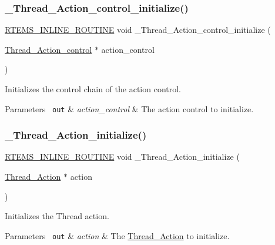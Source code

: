 \subsubsection{\texorpdfstring{\_Thread\_Action\_control\_initialize()}{\_Thread\_Action\_control\_initialize()}}
{\footnotesize\ttfamily \mbox{\hyperlink{group__RTEMSScoreBaseDefs_gac216239df231d5dbd15e3520b0b9313f}{R\+T\+E\+M\+S\+\_\+\+I\+N\+L\+I\+N\+E\+\_\+\+R\+O\+U\+T\+I\+NE}} void \+\_\+\+Thread\+\_\+\+Action\+\_\+control\+\_\+initialize (\begin{DoxyParamCaption}\item[{\mbox{\hyperlink{structThread__Action__control}{Thread\+\_\+\+Action\+\_\+control}} $\ast$}]{action\+\_\+control }\end{DoxyParamCaption})}



Initializes the control chain of the action control. 


\begin{DoxyParams}[1]{Parameters}
\mbox{\texttt{ out}}  & {\em action\+\_\+control} & The action control to initialize. \\
\hline
\end{DoxyParams}
\mbox{\label{group__RTEMSScoreThread_gaaae54223afb793365b74ff959e0d2369}} 
\subsubsection{\texorpdfstring{\_Thread\_Action\_initialize()}{\_Thread\_Action\_initialize()}}
{\footnotesize\ttfamily \mbox{\hyperlink{group__RTEMSScoreBaseDefs_gac216239df231d5dbd15e3520b0b9313f}{R\+T\+E\+M\+S\+\_\+\+I\+N\+L\+I\+N\+E\+\_\+\+R\+O\+U\+T\+I\+NE}} void \+\_\+\+Thread\+\_\+\+Action\+\_\+initialize (\begin{DoxyParamCaption}\item[{\mbox{\hyperlink{structThread__Action}{Thread\+\_\+\+Action}} $\ast$}]{action }\end{DoxyParamCaption})}



Initializes the Thread action. 


\begin{DoxyParams}[1]{Parameters}
\mbox{\texttt{ out}}  & {\em action} & The \mbox{\hyperlink{structThread__Action}{Thread\+\_\+\+Action}} to initialize. \\
\hline
\end{DoxyParams}
\mbox{\label{group__RTEMSScoreThread_gab19f3f385804128f7f975c8ed326765a}} 
